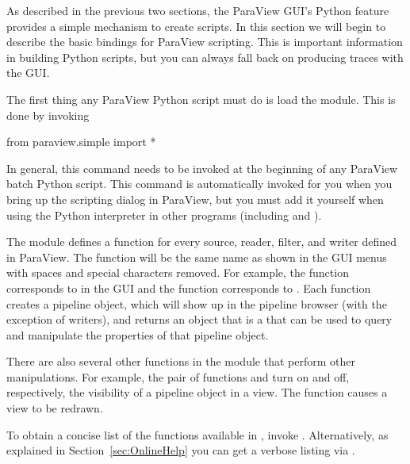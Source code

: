 As described in the previous two sections, the ParaView GUI's Python
 feature provides a simple mechanism to create scripts. In this
section we will begin to describe the basic bindings for ParaView
scripting. This is important information in building Python scripts, but
you can always fall back on producing traces with the GUI.

The first thing any ParaView Python script must do is load the
 module.  This is done by invoking
\begin{python}
from paraview.simple import *
\end{python}
In general, this command needs to be invoked at the beginning of any
ParaView batch Python script.  This command is automatically invoked for
you when you bring up the scripting dialog in ParaView, but you must add it
yourself when using the Python interpreter in other programs (including
 and ).


The  module defines a function for every source,
reader, filter, and writer defined in ParaView.  The function will be the
same name as shown in the GUI menus with spaces and special characters
removed.  For example, the  function corresponds to
 \ra {} in the GUI and the 
function corresponds to  \ra {} \ra {}.  Each function creates a pipeline object, which will show up
in the pipeline browser (with the exception of writers), and returns an
object that is a  that can be used to
query and manipulate the properties of that pipeline object.

There are also several other functions in the 
module that perform other manipulations.  For example, the pair of
functions  and  turn on and off, respectively,
the visibility of a pipeline object in a view.  The 
function causes a view to be redrawn.

To obtain a concise list of the functions available in ,
invoke . Alternatively, as explained in
Section~\ref{sec:OnlineHelp} you can get a verbose listing via
.

